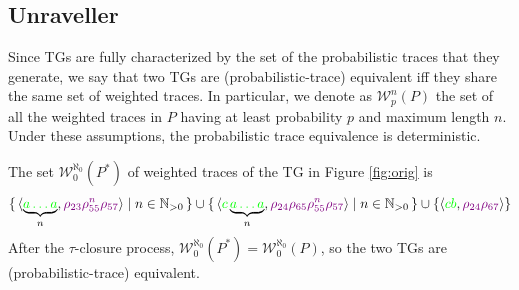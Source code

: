 \subsection{Unraveller}\label{sec:unrav}
Since TGs are fully characterized by the set of the probabilistic traces that they generate,  we say that two TGs are 
(probabilistic-trace) equivalent iff they share the same set of weighted traces. In particular, we denote as $\mathcal{W}_p^n(P)$ the set of all the weighted traces in $P$ having at least probability $p$ and maximum length $n$. Under these assumptions, the probabilistic trace equivalence is deterministic.

\begin{example}
	The set $\mathcal{W}_0^{\aleph_0}(P^*)$ of weighted traces of the TG in Figure \ref{fig:orig} is
$$\set{\braket{\underbrace{\color{green}a\dots a}_{n},{\color{violet}\rho_{23}\rho_{55}^n\rho_{57}}}|n\in \mathbb{N}_{>0}}\cup \set{\braket{{\color{green}c}\underbrace{\color{green}a\dots a}_{n},{\color{violet}\rho_{24}\rho_{65}\rho_{55}^n\rho_{57}}}|n\in \mathbb{N}_{>0}}\cup\{\braket{{\color{green}cb},{\color{violet}\rho_{24}\rho_{67}}}\}$$
After the $\tau$-closure process, $\mathcal{W}_0^{\aleph_0}(P^*)=\mathcal{W}_0^{\aleph_0}(P)$, so the two TGs are (probabilistic-trace) equivalent.
\end{example}
